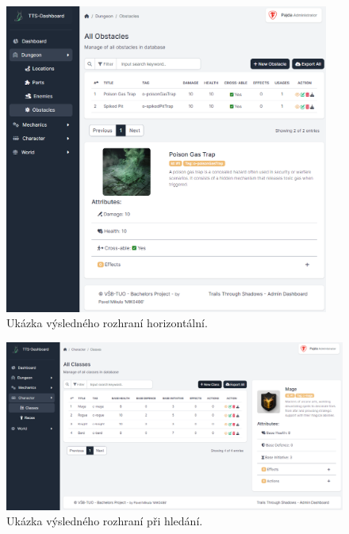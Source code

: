 \begin{figure}[ht]
    \centering
    \includegraphics[width=0.95\textwidth]{figures/dashboardTableHorizontal}
    \caption{Ukázka výsledného rozhraní horizontální.}
    \label{fig:interfaceScreenshotsTableHorizontal}
\end{figure}

\begin{figure}
    \centering
    \includegraphics[width=1.0\textwidth]{figures/dashboardTable}
    \caption{Ukázka výsledného rozhraní při hledání.}
    \label{fig:interfaceScreenshotsTable}
\end{figure}


